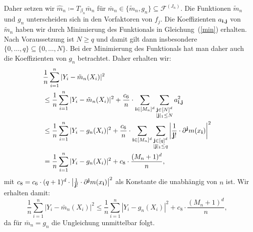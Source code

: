 Daher setzen wir $\hat{m}_n \coloneqq T_{\beta_n}\bar{m}_n$ für $\bar{m}_n \in \{\tilde{m}_n, g_n\} \subseteq \mathcal{F}^{(J_n)}$.
Die Funktionen $\tilde{m}_n$ und $g_n$ unterscheiden sich in den Vorfaktoren von $f_j$. Die Koeffizienten $a_{\mathbf{i},\mathbf{j}}$ von $\tilde{m}_n$ haben wir durch Minimierung des Funktionals in Gleichung~(\ref{min}) erhalten. Nach Voraussetzung ist $N \geq q$ und damit gilt dann insbesondere $\{0,\dots,q\} \subseteq \{0,\dots,N\}$. Bei der Minimierung des Funktionals hat man daher auch die Koeffizienten von $g_n$ betrachtet. Daher erhalten wir:
\begin{equation}
\begin{split}
\label{tilde}
& \frac{1}{n} \sum_{i = 1}^n|Y_i - \tilde{m}_n(X_i)|^2 \\
& \leq \frac{1}{n} \sum_{i = 1}^n|Y_i - \tilde{m}_n(X_i)|^2 + \frac{c_6}{n} \cdot \sum_{\mathbf{i} \in [M_n]^d} \sum_{\substack{ \mathbf{j} \in [N]^d \\ |\mathbf{j}|_1 \leq N}} a_{\mathbf{i},\mathbf{j}}^2 \\
& \leq \frac{1}{n} \sum_{i = 1}^n|Y_i - g_n(X_i)|^2 + \frac{c_6}{n} \cdot \sum_{\mathbf{i} \in [M_n]^d} \sum_{\substack{ \mathbf{j} \in [q]^d \\ |\mathbf{j}|_1 \leq q}} \bigg|\frac{1}{\mathbf{j}!} \cdot \partial^{\mathbf{j}}m(x_{\mathbf{i}})\bigg|^2 \\
& = \frac{1}{n} \sum_{i = 1}^n|Y_i - g_n(X_i)|^2 + c_{8} \cdot \frac{(M_n + 1)^d}{n},
\end{split}
\end{equation}
mit $c_{8} = c_6 \cdot (q + 1)^d \cdot \big|\frac{1}{\mathbf{j}!} \cdot \partial^{\mathbf{j}}m(x_{\mathbf{i}})\big|^2$ als Konstante die unabhängig von $n$ ist.
Wir erhalten damit:
\begin{equation}
\label{bed}
\frac{1}{n} \sum_{i = 1}^n|Y_i - \bar{m}_n(X_i)|^2 \leq \frac{1}{n} \sum_{i = 1}^n|Y_i - g_n(X_i)|^2 + c_8 \cdot \frac{(M_n + 1)^d}{n},
\end{equation}
da für $\bar{m}_n = g_n$ die Ungleichung unmittelbar folgt.

